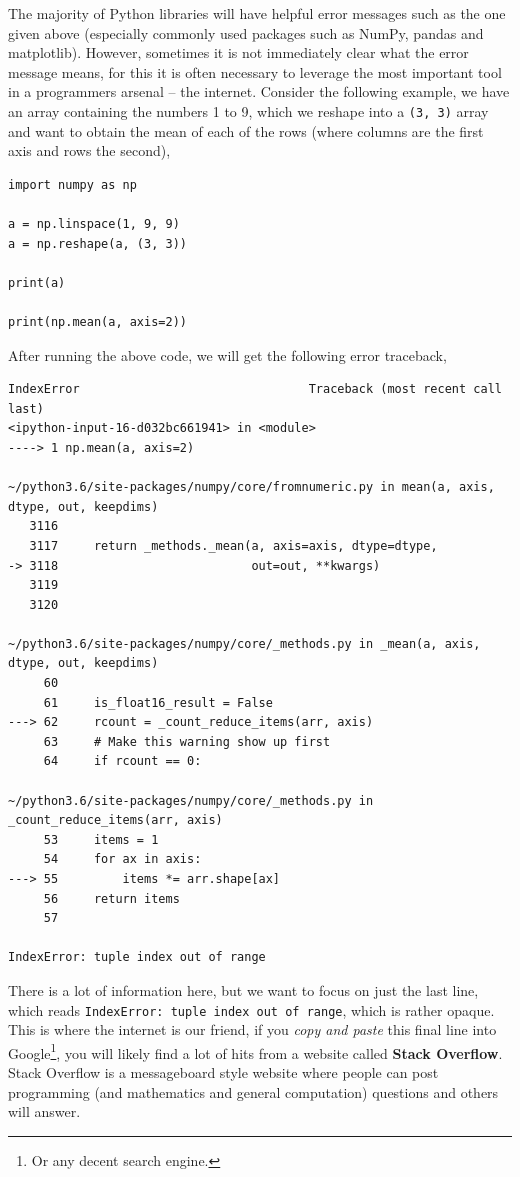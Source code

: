 \documentclass[a4paper]{article}
\begin{document}
The majority of Python libraries will have helpful error messages such as the one given above (especially commonly used packages such as NumPy, pandas and matplotlib).
However, sometimes it is not immediately clear what the error message means, for this it is often necessary to leverage the most important tool in a programmers arsenal -- the internet.
Consider the following example, we have an array containing the numbers 1 to 9, which we reshape into a \texttt{(3, 3)} array and want to obtain the mean of each of the rows (where columns are the first axis and rows the second),
\begin{lstlisting}
import numpy as np

a = np.linspace(1, 9, 9)
a = np.reshape(a, (3, 3))

print(a)

print(np.mean(a, axis=2))
\end{lstlisting}
After running the above code, we will get the following error traceback,
\begin{lstlisting}
IndexError                                Traceback (most recent call last)
<ipython-input-16-d032bc661941> in <module>
----> 1 np.mean(a, axis=2)

~/python3.6/site-packages/numpy/core/fromnumeric.py in mean(a, axis, dtype, out, keepdims)
   3116
   3117     return _methods._mean(a, axis=axis, dtype=dtype,
-> 3118                           out=out, **kwargs)
   3119
   3120

~/python3.6/site-packages/numpy/core/_methods.py in _mean(a, axis, dtype, out, keepdims)
     60
     61     is_float16_result = False
---> 62     rcount = _count_reduce_items(arr, axis)
     63     # Make this warning show up first
     64     if rcount == 0:

~/python3.6/site-packages/numpy/core/_methods.py in _count_reduce_items(arr, axis)
     53     items = 1
     54     for ax in axis:
---> 55         items *= arr.shape[ax]
     56     return items
     57

IndexError: tuple index out of range
\end{lstlisting}
There is a lot of information here, but we want to focus on just the last line, which reads \texttt{IndexError: tuple index out of range}, which is rather opaque.
This is where the internet is our friend, if you \emph{copy and paste} this final line into Google\footnote{Or any decent search engine.}, you will likely find a lot of hits from a website called \textbf{Stack Overflow}.
Stack Overflow is a messageboard style website where people can post programming (and mathematics and general computation) questions and others will answer.
\end{document}
